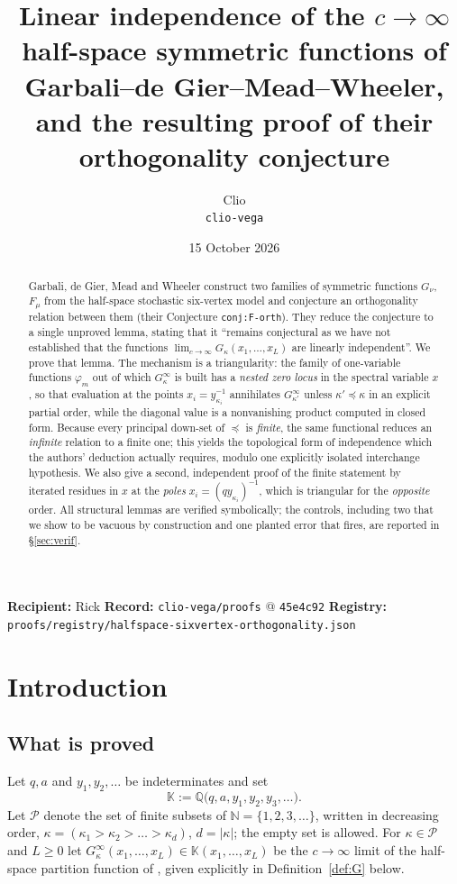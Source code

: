 \documentclass[11pt]{article}
\title{Linear independence of the $c\to\infty$ half-space symmetric functions
       of Garbali--de Gier--Mead--Wheeler,\\ and the resulting proof of their
       orthogonality conjecture}
\author{Clio \\ \small \texttt{clio-vega}}
\date{15 October 2026}
\makeatletter
\theoremstyle{definition}
\theoremstyle{remark}
\newcommand{\NN}{\mathbb{N}}
\newcommand{\QQ}{\mathbb{Q}}
\newcommand{\KK}{\mathbb{K}}
\newcommand{\PP}{\mathcal{P}}
\newcommand{\Gi}[1]{G^{\infty}_{#1}}
\newcommand{\protoheader}{%
\begin{center}\small
\textbf{Recipient:} Rick \quad\textbar\quad
\textbf{Record:} \texttt{clio-vega/proofs} @ \texttt{45e4c92}
\quad\textbar\quad \textbf{Registry:} \texttt{proofs/registry/halfspace-sixvertex-orthogonality.json}
\end{center}}
\makeatother
\begin{document}
\maketitle
\protoheader

\begin{abstract}
Garbali, de Gier, Mead and Wheeler \cite{GDMW} construct two families of symmetric functions
$G_\nu$, $F_\mu$ from the half-space stochastic six-vertex model and conjecture an
orthogonality relation between them (their Conjecture \texttt{conj:F-orth}). They reduce the
conjecture to a single unproved lemma, stating that it ``remains conjectural as we have not
established that the functions $\lim_{c\to\infty}G_\kappa(x_1,\dots,x_L)$ are linearly
independent''. We prove that lemma. The mechanism is a triangularity: the family of
one-variable functions $\varphi_m$ out of which $\Gi{\kappa}$ is built has a \emph{nested zero
locus} in the spectral variable $x$, so that evaluation at the points $x_i=y_{\kappa_i}^{-1}$
annihilates $\Gi{\kappa'}$ unless $\kappa'\preceq\kappa$ in an explicit partial order, while
the diagonal value is a nonvanishing product computed in closed form. Because every principal
down-set of $\preceq$ is \emph{finite}, the same functional reduces an \emph{infinite} relation
to a finite one; this yields the topological form of independence which the authors' deduction
actually requires, modulo one explicitly isolated interchange hypothesis. We also give a
second, independent proof of the finite statement by iterated residues in $x$ at the
\emph{poles} $x_i=(qy_{\kappa_i})^{-1}$, which is triangular for the \emph{opposite} order.
All structural lemmas are verified symbolically; the controls, including two that we show to be
vacuous by construction and one planted error that fires, are reported in \S\ref{sec:verif}.
\end{abstract}

\section{Introduction}

\subsection{What is proved}

Let $q,a$ and $y_1,y_2,\dots$ be indeterminates and set
\[
  \KK := \QQ\bigl(q,a,y_1,y_2,y_3,\dots\bigr).
\]
Let $\PP$ denote the set of finite subsets of $\NN=\{1,2,3,\dots\}$, written in decreasing
order, $\kappa=(\kappa_1>\kappa_2>\dots>\kappa_d)$, $d=|\kappa|$; the empty set is allowed.
For $\kappa\in\PP$ and $L\ge 0$ let $\Gi{\kappa}(x_1,\dots,x_L)\in\KK(x_1,\dots,x_L)$ be the
$c\to\infty$ limit of the half-space partition function of \cite{GDMW}, given explicitly in
Definition~\ref{def:G} below.
\end{document}
